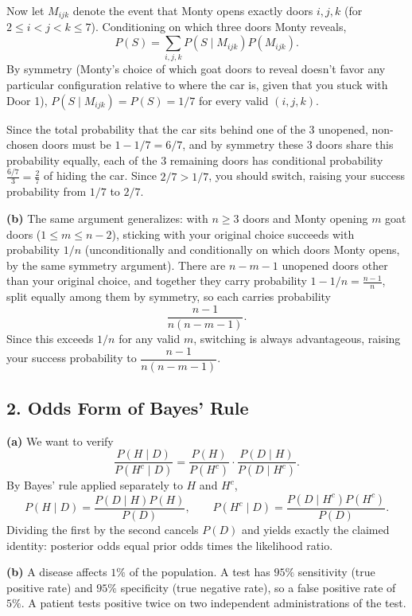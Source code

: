 \documentclass{article}
\begin{document}
Now let $M_{ijk}$ denote the event that Monty opens exactly doors $i,j,k$ (for $2\le i<j<k\le 7$). Conditioning on which three doors Monty reveals,
$$
P(S) = \sum_{i,j,k} P(S\mid M_{ijk})P(M_{ijk}).
$$
By symmetry (Monty's choice of which goat doors to reveal doesn't favor any particular configuration relative to where the car is, given that you stuck with Door 1), $P(S\mid M_{ijk})=P(S)=1/7$ for every valid $(i,j,k)$.

Since the total probability that the car sits behind one of the $3$ unopened, non-chosen doors must be $1-1/7 = 6/7$, and by symmetry these $3$ doors share this probability equally, each of the $3$ remaining doors has conditional probability $\frac{6/7}{3}=\frac{2}{7}$ of hiding the car. Since $2/7 > 1/7$, you should switch, raising your success probability from $1/7$ to $2/7$.

\medskip
\textbf{(b)} The same argument generalizes: with $n\ge3$ doors and Monty opening $m$ goat doors ($1\le m\le n-2$), sticking with your original choice succeeds with probability $1/n$ (unconditionally and conditionally on which doors Monty opens, by the same symmetry argument). There are $n-m-1$ unopened doors other than your original choice, and together they carry probability $1-1/n=\frac{n-1}{n}$, split equally among them by symmetry, so each carries probability
$$
\frac{n-1}{n(n-m-1)}.
$$
Since this exceeds $1/n$ for any valid $m$, switching is always advantageous, raising your success probability to $\dfrac{n-1}{n(n-m-1)}$.

\subsection*{2. Odds Form of Bayes' Rule}

\textbf{(a)} We want to verify
$$
\frac{P(H\mid D)}{P(H^c\mid D)} = \frac{P(H)}{P(H^c)}\cdot\frac{P(D\mid H)}{P(D\mid H^c)}.
$$
By Bayes' rule applied separately to $H$ and $H^c$,
$$
P(H\mid D) = \frac{P(D\mid H)P(H)}{P(D)}, \qquad P(H^c\mid D) = \frac{P(D\mid H^c)P(H^c)}{P(D)}.
$$
Dividing the first by the second cancels $P(D)$ and yields exactly the claimed identity: posterior odds equal prior odds times the likelihood ratio.

\medskip
\textbf{(b)} A disease affects $1\%$ of the population. A test has $95\%$ sensitivity (true positive rate) and $95\%$ specificity (true negative rate), so a false positive rate of $5\%$. A patient tests positive twice on two independent administrations of the test.
\end{document}
